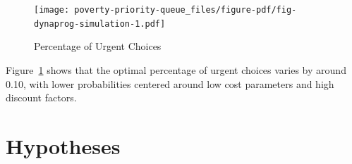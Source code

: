 \documentclass[
]{report}
\begin{document}
\begin{figure}

{\centering \texttt{[image: poverty-priority-queue\_files/figure-pdf/fig-dynaprog-simulation-1.pdf]}

}

\caption{\label{fig-dynaprog-simulation}Percentage of Urgent Choices}

\end{figure}

Figure~\ref{fig-dynaprog-simulation} shows that the optimal percentage
of urgent choices varies by around 0.10, with lower probabilities
centered around low cost parameters and high discount factors.

\hypertarget{hypotheses}{%
\section{Hypotheses}\label{hypotheses}}
\end{document}
